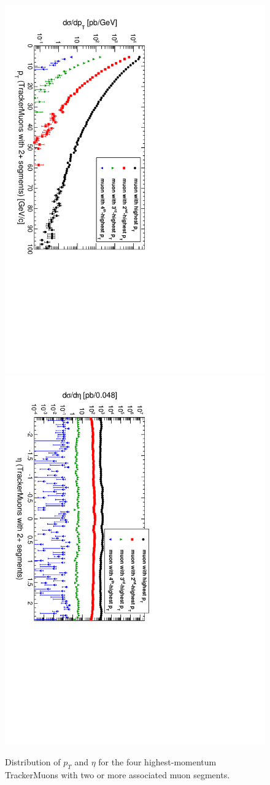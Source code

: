 \documentclass[12pt]{article}
\begin{document}
\begin{figure}
\includegraphics[height=0.5\linewidth, angle=90]{fig/backgroundsMatching_plot/ptcurves_TwoChambers.pdf}
\includegraphics[height=0.5\linewidth, angle=90]{fig/backgroundsMatching_plot/etacurves_TwoChambers.pdf}

\caption{Distribution of $p_T$ and $\eta$ for the four highest-momentum TrackerMuons with two or more associated muon segments. \label{fig:curves_TwoChambers}}
\end{figure}
\end{document}
